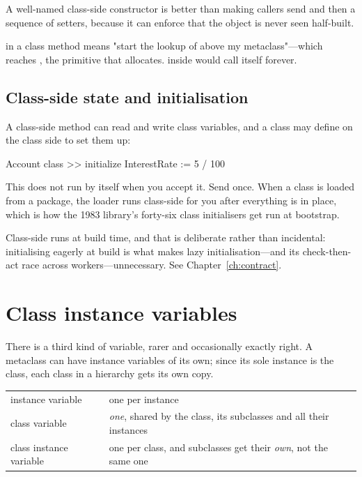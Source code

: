 A well-named class-side constructor is better than making callers send
 and then a sequence of setters, because it can enforce that the
object is never seen half-built.

\begin{stnote}
 in a class method means "start the lookup of  above my
metaclass"---which reaches , the primitive that allocates.
 inside  would call itself forever.
\end{stnote}

\subsection{Class-side state and initialisation}

A class-side method can read and write class variables, and a class may define
 on the class side to set them up:

\begin{st}
Account class >> initialize
    InterestRate := 5 / 100
\end{st}

This does not run by itself when you accept it. Send 
once. When a class is loaded from a package, the loader runs class-side
 for you after everything is in place, which is how the 1983
library's forty-six class initialisers get run at bootstrap.

\begin{stwarn}
Class-side  runs at build time, and that is deliberate rather
than incidental: initialising eagerly at build is what makes lazy
initialisation---and its check-then-act race across workers---unnecessary. See
Chapter~\ref{ch:contract}.
\end{stwarn}

\section{Class instance variables}

There is a third kind of variable, rarer and occasionally exactly right. A
metaclass can have instance variables of its own; since its sole instance is
the class, each class in a hierarchy gets its own copy.

\begin{center}
\small
\begin{tabular}{@{}lp{}@{}}
\toprule
instance variable & one per instance\\
class variable & \emph{one}, shared by the class, its subclasses and all their
  instances\\
class instance variable & one per class, and subclasses get their \emph{own},
  not the same one\\
\bottomrule
\end{tabular}
\end{center}

